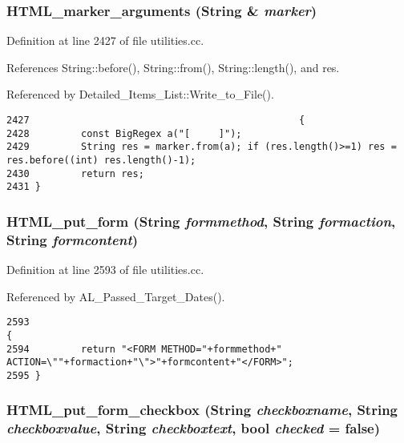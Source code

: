 \subsubsection{ HTML\_\-marker\_\-arguments ({\bf String} \& {\em marker})}\label{dil2al_8hh_a251}




Definition at line 2427 of file utilities.cc.

References String::before(), String::from(), String::length(), and res.

Referenced by Detailed\_\-Items\_\-List::Write\_\-to\_\-File().



\footnotesize\begin{verbatim}2427                                               {
2428         const BigRegex a("[     ]");
2429         String res = marker.from(a); if (res.length()>=1) res = res.before((int) res.length()-1);
2430         return res;
2431 }
\end{verbatim}\normalsize 
{}
\subsubsection{ HTML\_\-put\_\-form ({\bf String} {\em formmethod}, {\bf String} {\em formaction}, {\bf String} {\em formcontent})}\label{dil2al_8hh_a269}




Definition at line 2593 of file utilities.cc.

Referenced by AL\_\-Passed\_\-Target\_\-Dates().



\footnotesize\begin{verbatim}2593                                                                                {
2594         return "<FORM METHOD="+formmethod+" ACTION=\""+formaction+"\">"+formcontent+"</FORM>";
2595 }
\end{verbatim}\normalsize 
{}
\subsubsection{ HTML\_\-put\_\-form\_\-checkbox ({\bf String} {\em checkboxname}, {\bf String} {\em checkboxvalue}, {\bf String} {\em checkboxtext}, bool {\em checked} = {\bf false})}\label{dil2al_8hh_a274}




